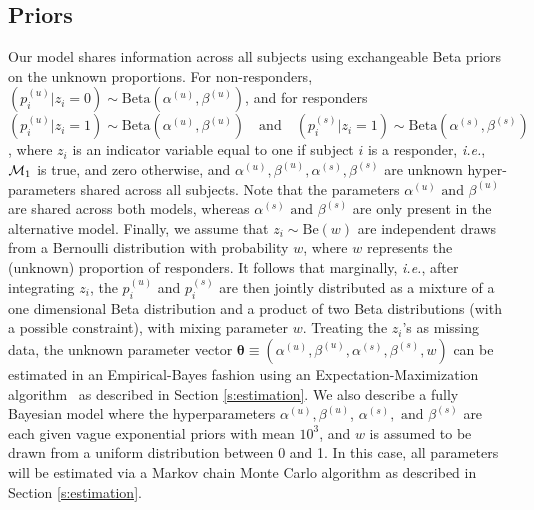 \documentclass[12pt,oupdraft]{biostatistics}
\begin{document}
\subsection{Priors}
\label{ss:priors}
Our model shares information across all subjects using exchangeable Beta priors on the unknown proportions. For non-responders, $(p^{(u)}_{i} | z_{i}=0)  \sim \mathrm{Beta}(\alpha^{(u)}, \beta^{(u)})$, and for responders $(p^{(u)}_{i}|z_{i}=1) \sim \mathrm{Beta}(\alpha^{(u)}, \beta^{(u)}) \quad\mathrm{and}\quad (p^{(s)}_{i} | z_{i}=1)  \sim \mathrm{Beta}(\alpha^{(s)},\beta^{(s)})$, %
 where $z_i$ is an indicator variable equal to one if subject $i$ is a responder, \textit{i.e.}, ${\cal M}_1$ is true, and zero otherwise, and $\alpha^{(u)}, \beta^{(u)}, \alpha^{(s)},\beta^{(s)}$ are unknown hyper-parameters shared across all subjects.
Note that the parameters $\alpha^{(u)} \text{ and } \beta^{(u)}$ are  shared across both models, whereas $\alpha^{(s)} \text{ and } \beta^{(s)}$ are only present in the alternative model.
Finally, we assume that $z_i\sim \mathrm{Be}(w)$ are independent draws from a Bernoulli distribution with probability $w$, where $w$ represents the (unknown) proportion of responders.
It follows that marginally, \textit{i.e.}, after integrating $z_i$, the $p^{(u)}_{i}$ and $p^{(s)}_{i}$ are then jointly distributed as a mixture of a one dimensional Beta distribution and a product of two Beta distributions (with a possible constraint), with mixing parameter $w$.
Treating the $z_i$'s as missing data, the unknown parameter vector $\boldsymbol\theta\equiv(\alpha^{(u)}, \beta^{(u)}, \alpha^{(s)},\beta^{(s)}, w)$ can be estimated in an Empirical-Bayes fashion using an Expectation-Maximization algorithm~\citep{Dempster:1977ul} as described in Section \ref{s:estimation}.
We also describe a fully Bayesian model where the hyperparameters $\alpha^{(u)}, \beta^{(u)}$, $\alpha^{(s)},\text{ and }\beta^{(s)}$ are each given vague exponential priors with mean $10^3$, and $w$ is assumed to be drawn from a uniform distribution between 0 and 1.
In this case, all parameters will be estimated via a Markov chain Monte Carlo algorithm as described in Section \ref{s:estimation}.
\end{document}
